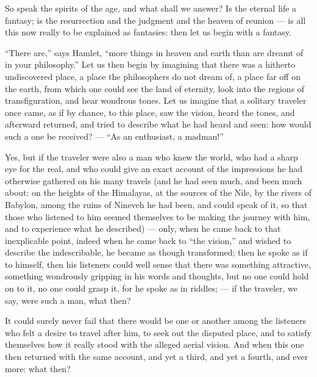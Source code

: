 \documentclass[12pt,a4paper]{book}
\begin{document}
So speak the spirits of the age, and what shall we answer? Is the eternal life a fantasy; is the resurrection and the judgment and
the heaven of reunion --- is all this now really to be explained as fantasies: then let us begin with a fantasy.

``There are,'' says Hamlet, ``more things in heaven and earth than are dreamt of in your philosophy.'' Let us then begin by imagining that there was a hitherto undiscovered place, a place the philosophers do not dream of, a place far off on the earth, from which one could see the land of eternity, look into the regions of transfiguration, and hear wondrous tones. Let us imagine that a solitary traveler once came, as if by chance, to this place, saw the vision, heard the tones, and afterward returned, and tried to describe what he had heard and seen: how would such a one be received? --- ``As an enthusiast, a madman!''

Yes, but if the traveler were also a man who knew the world, who had a sharp eye for the real, and who could give an exact account of the impressions he had otherwise gathered on his many travels (and he had seen much, and been much about: on the heights of the Himalayas, at the sources of the Nile, by the rivers of Babylon, among the ruins of Nineveh he had been, and could speak of it, so that those who listened to him seemed themselves to be making the journey with him, and to experience what he described) --- only, when he came back to that inexplicable point, indeed when he came back to ``the vision,'' and wished to describe the indescribable, he became as though transformed; then he spoke as if to himself, then his listeners could well sense that there was something attractive, something wondrously gripping in his words and thoughts, but no one could hold on to it, no one could grasp it, for he spoke as in riddles; --- if the traveler, we say, were such a man, what then?

It could surely never fail that there would be one or another among the listeners who felt a desire to travel after him, to seek out the disputed place, and to satisfy themselves how it really stood with the alleged aerial vision. And when this one then returned with the same account,
and yet a third, and yet a fourth, and ever more: what then?
\end{document}
